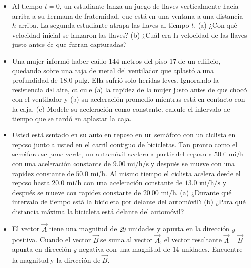 \documentclass[11pt,a4paper]{article}
\begin{document}
\begin{itemize}
    \item[\textbf{13.}] Al tiempo $t = 0$, un estudiante lanza un juego de llaves verticalmente hacia arriba a su hermana de fraternidad, que está en una ventana a una distancia $h$ arriba. La segunda estudiante atrapa las llaves al tiempo $t$. (a) ¿Con qué velocidad inicial se lanzaron las llaves? (b) ¿Cuál era la velocidad de las llaves justo antes de que fueran capturadas?
    \vspace*{6cm}

    \item[\textbf{14.}] Una mujer informó haber caído $144$ metros del piso 17 de un edificio, quedando sobre una caja de metal del ventilador que aplastó a una profundidad de $18.0 \text{ pulg}$. Ella sufrió solo heridas leves. Ignorando la resistencia del aire, calcule (a) la rapidez de la mujer justo antes de que chocó con el ventilador y (b) su aceleración promedio mientras está en contacto con la caja. (c) Modele su aceleración como constante, calcule el intervalo de tiempo que se tardó en aplastar la caja.
    \vspace*{6cm}

    \item[\textbf{15.}] Usted está sentado en su auto en reposo en un semáforo con un ciclista en reposo junto a usted en el carril contiguo de bicicletas. Tan pronto como el semáforo se pone verde, un automóvil acelera a partir del reposo a $50.0 \text{ mi/h}$ con una aceleración constante de $9.00 \text{ mi/h/s}$ y después se mueve con una rapidez constante de $50.0 \text{ mi/h}$. Al mismo tiempo el ciclista acelera desde el reposo hasta $20.0 \text{ mi/h}$ con una aceleración constante de $13.0 \text{ mi/h/s}$ y después se mueve con rapidez constante de $20.00 \text{ mi/h}$. (a) ¿Durante qué intervalo de tiempo está la bicicleta por delante del automóvil? (b) ¿Para qué distancia máxima la bicicleta está delante del automóvil?
    \vspace*{8cm}

    \item[\textbf{16.}] El vector $\vec{A}$ tiene una magnitud de $29$ unidades y apunta en la dirección $y$ positiva. Cuando el vector $\vec{B}$ se suma al vector $\vec{A}$, el vector resultante $\vec{A} + \vec{B}$ apunta en dirección $y$ negativa con una magnitud de $14$ unidades. Encuentre la magnitud y la dirección de $\vec{B}$.
    \vspace*{6cm}
\end{itemize}
\end{document}

